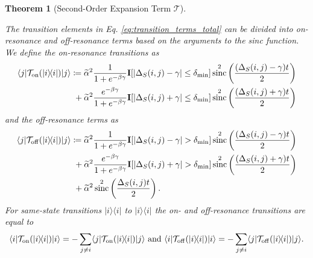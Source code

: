 \documentclass{article}
\newtheorem{theorem}{Theorem}
\newcommand{\on}{\rm on}
\newcommand{\off}{\rm off}
\newcommand{\ket}[1]{|#1\rangle}
\newcommand{\bra}[1]{\langle #1|}
\newcommand{\ketbra}[2]{| #1\rangle\! \langle #2|}
\newcommand{\TT}{\mathcal{T}}
\DeclareMathOperator{\sinc}{sinc}
\begin{document}
\begin{theorem}[Second-Order Expansion Term $\mathcal{T}$]
\begin{enumerate}
\end{enumerate}
The transition elements in Eq. \eqref{eq:transition_terms_total} can be divided into on-resonance and off-resonance terms based on the arguments to the sinc function. We define the on-resonance transitions as
\begin{align}
    \bra{j} \TT_{\on}(\ketbra{i}{i})\ket{j} &\coloneqq \widetilde{\alpha}^2 \frac{1}{1 + e^{-\beta \gamma}} \mathbf{I}[|\Delta_S(i,j) - \gamma| \le \delta_{\min}]  \sinc^2\left(\frac{(\Delta_S(i,j) - \gamma)t}{2}\right) \nonumber \\
    &~+ \widetilde{\alpha}^2 \frac{e^{-\beta \gamma}}{1 + e^{-\beta \gamma}} \mathbf{I}[|\Delta_S(i,j) + \gamma| \le \delta_{\min}]  \sinc^2\left(\frac{(\Delta_S(i,j) + \gamma)t}{2}\right) \label{eq:on_resonance}
\end{align}
and the off-resonance terms as
\begin{equation}
\begin{split}
    \bra{j} \TT_{\off}(\ketbra{i}{i})\ket{j} &\coloneqq \widetilde{\alpha}^2 \frac{1}{1 + e^{-\beta \gamma}} \mathbf{I}[|\Delta_S(i,j) - \gamma| > \delta_{\min}]  \sinc^2\left(\frac{(\Delta_S(i,j) - \gamma)t}{2}\right)  \\
    &~+ \widetilde{\alpha}^2 \frac{e^{-\beta \gamma}}{1 + e^{-\beta \gamma}} \mathbf{I}[|\Delta_S(i,j) + \gamma| > \delta_{\min}]  \sinc^2\left(\frac{(\Delta_S(i,j) + \gamma)t}{2}\right)  \\
    &~+ \widetilde{\alpha}^2 \sinc^2 \left( \frac{\Delta_S(i,j)t}{2} \right). \label{eq:off_resonance}
    \end{split}
\end{equation}
For same-state transitions $\ketbra{i}{i}$ to $\ketbra{i}{i}$ the on- and off-resonance transitions are equal to
\begin{equation}
    \bra{i} \TT_{\on}(\ketbra{i}{i}) \ket{i} = - \sum_{j \neq i}\bra{j} \TT_{\on}(\ketbra{i}{i}) \ket{j} \text{ and } \bra{i} \TT_{\off}(\ketbra{i}{i}) \ket{i} = - \sum_{j \neq i}\bra{j} \TT_{\off}(\ketbra{i}{i}) \ket{j}. \label{eq:same_state_transition_resonances}
\end{equation}
\end{theorem}
\end{document}
